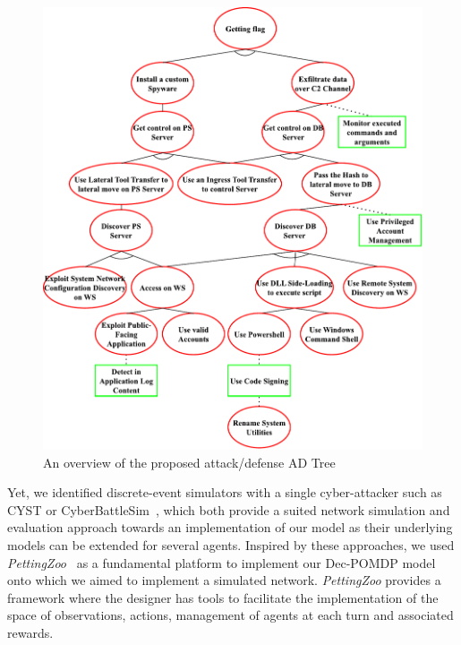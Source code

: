 \documentclass[conference]{IEEEtran}
\begin{document}
\begin{figure}
    \centering
    \includegraphics[width=\linewidth]{figures/ADTree.pdf}
    \caption{An overview of the proposed attack/defense AD Tree}
    \label{fig:ADTree}
\end{figure}

Yet, we identified discrete-event simulators with a single cyber-attacker such as CYST\cite{drasar_session-level_2020} or CyberBattleSim~\cite{cyberbattlesim}, which both provide a suited network simulation and evaluation approach towards an implementation of our model as their underlying models can be extended for several agents. Inspired by these approaches, we used \textit{PettingZoo}~\cite{jk2020} as a fundamental platform to implement our Dec-POMDP model onto which we aimed to implement a simulated network. \textit{PettingZoo} provides a framework where the designer has tools to facilitate the implementation of the space of observations, actions, management of agents at each turn and associated rewards.

\end{document}
